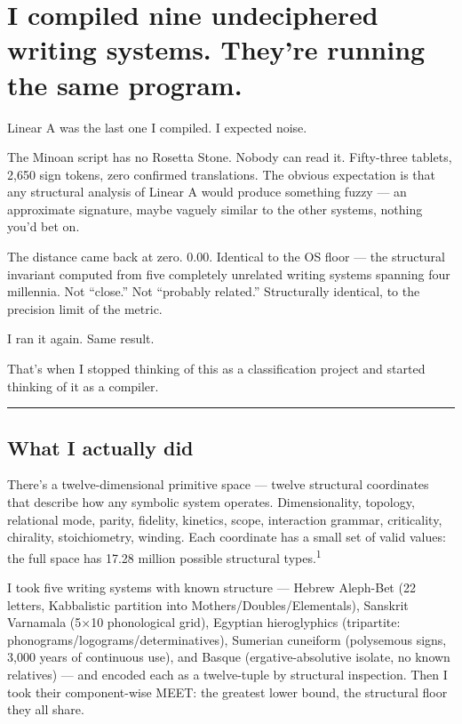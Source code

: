 \hypertarget{i-compiled-nine-undeciphered-writing-systems.-theyre-running-the-same-program.}{%
\section{I compiled nine undeciphered writing systems. They're running
the same
program.}\label{i-compiled-nine-undeciphered-writing-systems.-theyre-running-the-same-program.}}

Linear A was the last one I compiled. I expected noise.

The Minoan script has no Rosetta Stone. Nobody can read it. Fifty-three
tablets, 2,650 sign tokens, zero confirmed translations. The obvious
expectation is that any structural analysis of Linear A would produce
something fuzzy --- an approximate signature, maybe vaguely similar to
the other systems, nothing you'd bet on.

The distance came back at zero. 0.00. Identical to the OS floor --- the
structural invariant computed from five completely unrelated writing
systems spanning four millennia. Not ``close.'' Not ``probably
related.'' Structurally identical, to the precision limit of the metric.

I ran it again. Same result.

That's when I stopped thinking of this as a classification project and
started thinking of it as a compiler.

\begin{center}\rule{0.5\linewidth}{0.5pt}\end{center}

\hypertarget{what-i-actually-did}{%
\subsection{What I actually did}\label{what-i-actually-did}}

There's a twelve-dimensional primitive space --- twelve structural
coordinates that describe how any symbolic system operates.
Dimensionality, topology, relational mode, parity, fidelity, kinetics,
scope, interaction grammar, criticality, chirality, stoichiometry,
winding. Each coordinate has a small set of valid values: the full space
has 17.28 million possible structural types.\textsuperscript{1}

I took five writing systems with known structure --- Hebrew Aleph-Bet
(22 letters, Kabbalistic partition into Mothers/Doubles/Elementals),
Sanskrit Varnamala (5×10 phonological grid), Egyptian hieroglyphics
(tripartite: phonograms/logograms/determinatives), Sumerian cuneiform
(polysemous signs, 3,000 years of continuous use), and Basque
(ergative-absolutive isolate, no known relatives) --- and encoded each
as a twelve-tuple by structural inspection. Then I took their
component-wise MEET: the greatest lower bound, the structural floor they
all share.

